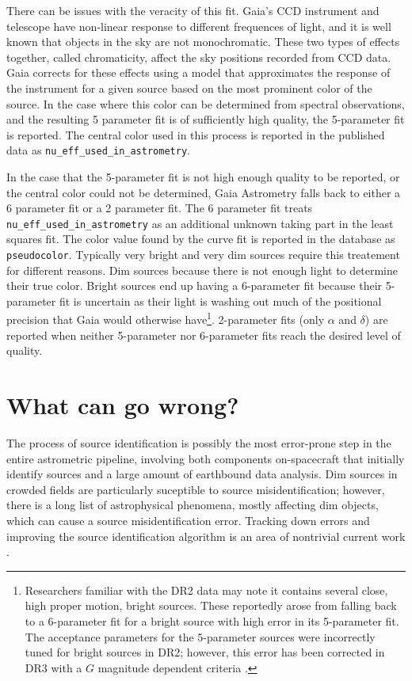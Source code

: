 \documentclass[preprint2]{aastex631}
\begin{document}
There can be issues with the veracity of this fit. Gaia's CCD instrument and telescope have non-linear response to different frequences of light, and it is well known that objects in the sky are not monochromatic. These two types of effects together, called chromaticity, affect the sky positions recorded from CCD data. Gaia corrects for these effects using a model that approximates the response of the instrument for a given source based on the most prominent color of the source. In the case where this color can be determined from spectral observations, and the resulting 5 parameter fit is of sufficiently high quality, the 5-parameter fit is reported. The central color used in this process is reported in the published data as \texttt{nu\_eff\_used\_in\_astrometry}.

In the case that the 5-parameter fit is not high enough quality to be reported, or the central color could not be determined, Gaia Astrometry falls back to either a 6 parameter fit or a 2 parameter fit. The 6 parameter fit treats \texttt{nu\_eff\_used\_in\_astrometry} as an additional unknown taking part in the least squares fit. The color value found by the curve fit is reported in the database as \texttt{pseudocolor}. Typically very bright and very dim sources require this treatement for different reasons. Dim sources because there is not enough light to determine their true color. Bright sources end up having a 6-parameter fit because their 5-parameter fit is uncertain as their light is washing out much of the positional precision that Gaia would otherwise have\footnote{Researchers familiar with the DR2 data may note it contains several close, high proper motion, bright sources. These reportedly arose from falling back to a 6-parameter fit for a bright source with high error in its 5-parameter fit. The acceptance parameters for the 5-parameter sources were incorrectly tuned for bright sources in DR2; however, this error has been corrected in DR3 with a $G$ magnitude dependent criteria \citep{lindegrenGaia2021a}.}. 2-parameter fits (only $\alpha$ and $\delta$) are reported when neither 5-parameter nor 6-parameter fits reach the desired level of quality.

\section{What can go wrong?} \label{sec:wrong}

The process of source identification is possibly the most error-prone step in the entire astrometric pipeline, involving both components on-spacecraft that initially identify sources and a large amount of earthbound data analysis. Dim sources in crowded fields are particularly suceptible to source misidentification; however, there is a long list of astrophysical phenomena, mostly affecting dim objects, which can cause a source misidentification error. Tracking down errors and improving the source identification algorithm is an area of nontrivial current work \cite{torraGaia2021}.%
\end{document}
